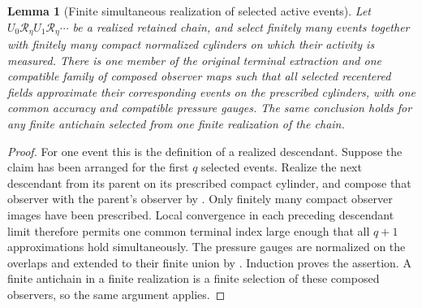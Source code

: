 \documentclass[11pt]{amsart}
\numberwithin{equation}{section}
\theoremstyle{plain}
\newtheorem{lemma}[lemma]{Lemma}
\theoremstyle{definition}
\theoremstyle{remark}
\begin{document}
\begin{lemma}[Finite simultaneous realization of selected active events]
\label{lem:finite-simultaneous-active-realization}
Let \(U_0\mathcal R_\eta U_1\mathcal R_\eta\cdots\) be a realized retained
chain, and select finitely many events together with finitely many compact
normalized cylinders on which their activity is measured.  There is one member
of the original terminal extraction and one compatible family of composed
observer maps such that all selected recentered fields approximate their
corresponding events on the prescribed cylinders, with one common accuracy
and compatible pressure gauges.  The same conclusion holds for any finite
antichain selected from one finite realization of the chain.
\end{lemma}

\begin{proof}
For one event this is the definition of a realized descendant.  Suppose the
claim has been arranged for the first \(q\) selected events.  Realize the next
descendant from its parent on its prescribed compact cylinder, and compose
that observer with the parent's observer by
.  Only finitely many compact observer images
have been prescribed.  Local convergence in each preceding descendant limit
therefore permits one common terminal index large enough that all \(q+1\)
approximations hold simultaneously.  The pressure gauges are normalized on
the overlaps and extended to their finite union by
.  Induction proves the assertion.  A finite
antichain in a finite realization is a finite selection of these composed
observers, so the same argument applies.
\end{proof}
\end{document}
